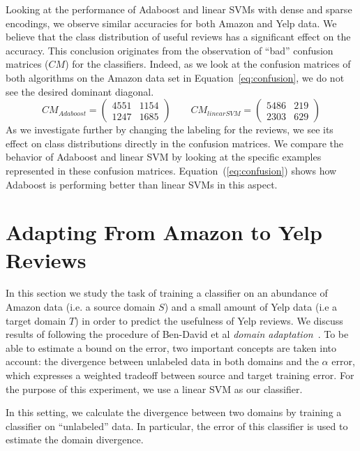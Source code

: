 \documentclass[letterpaper]{article}
\begin{document}
Looking at the performance of Adaboost and linear SVMs with dense and
sparse encodings, we observe similar accuracies for both Amazon and
Yelp data. We believe that the class distribution of useful reviews has 
a significant effect on the accuracy. This conclusion originates from 
the observation of ``bad'' confusion matrices ($CM$) for the classifiers. 
Indeed, as we look at the confusion matrices of both algorithms on the 
Amazon data set in Equation~\ref{eq:confusion}, we do not see the desired 
dominant diagonal.
\begin{equation}
\label{eq:confusion}
CM_{Adaboost} = \left(
\begin{matrix}
4551 & 1154\\
1247 & 1685
\end{matrix}
\right)
\qquad
CM_{linearSVM} = \left(
\begin{matrix}
5486 & 219\\
2303 & 629
\end{matrix}
\right)
\end{equation}
As we investigate further by changing the labeling for the reviews, we
see its effect on class distributions directly in the confusion
matrices. We compare the behavior of Adaboost and linear SVM by
looking at the specific examples represented in these confusion
matrices. Equation~(\ref{eq:confusion}) shows how Adaboost is
performing better than linear SVMs in this aspect.

\section{Adapting From Amazon to Yelp Reviews}
\label{sec:background}

In this section we study the task of training a classifier on an abundance of
Amazon data (i.e. a source domain $S$) and a small amount of Yelp data (i.e 
a target domain $T$) in order to predict the usefulness
of Yelp reviews. We discuss results of following the procedure of Ben-David 
et al \emph{domain adaptation}~\cite{JennLearnDiffDomains}.  To be able to 
estimate a bound on the error, two important concepts are taken into account: 
the divergence between unlabeled data in both domains and the $\alpha$ error,
which expresses a weighted tradeoff between source and target training error.
For the purpose of this experiment, we use a linear SVM as our classifier.

In this setting, we calculate the divergence between two domains by
training a classifier on ``unlabeled'' data. In particular, the error of 
this classifier is used to estimate the domain divergence.
\end{document}
